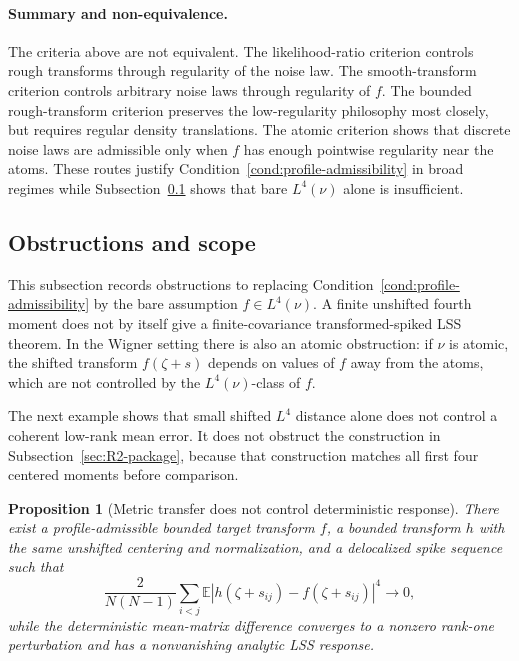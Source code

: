 \documentclass[11pt]{article}
\newtheorem{proposition}[theorem]{Proposition}
\theoremstyle{definition}
\theoremstyle{remark}
\newcommand{\E}{\mathbb E}
\begin{document}
\paragraph{Summary and non-equivalence.}

The criteria above are not equivalent.  The likelihood-ratio criterion controls rough transforms through regularity of the noise law.  The smooth-transform criterion controls arbitrary noise laws through regularity of \(f\).  The bounded rough-transform criterion preserves the low-regularity philosophy most closely, but requires regular density translations.  The atomic criterion shows that discrete noise laws are admissible only when \(f\) has enough pointwise regularity near the atoms.  These routes justify Condition~\ref{cond:profile-admissibility} in broad regimes while Subsection~\ref{app:bare-L4-obstructions} shows that bare \(L^4(\nu)\) alone is insufficient.
\subsection{Obstructions and scope}
\label{app:bare-L4-obstructions}
\label{app:counterexample-W}

This subsection records obstructions to replacing Condition~\ref{cond:profile-admissibility} by the bare assumption \(f\in L^4(\nu)\).  A finite unshifted fourth moment does not by itself give a finite-covariance transformed-spiked LSS theorem.  In the Wigner setting there is also an atomic obstruction: if \(\nu\) is atomic, the shifted transform \(f(\zeta+s)\) depends on values of \(f\) away from the atoms, which are not controlled by the \(L^4(\nu)\)-class of \(f\).

The next example shows that small shifted \(L^4\) distance alone does not control a coherent low-rank mean error.  It does not obstruct the construction in Subsection~\ref{sec:R2-package}, because that construction matches all first four centered moments before comparison.

\begin{proposition}[Metric transfer does not control deterministic response]
\label{prop:E-metric-not-response}
There exist a profile-admissible bounded target transform \(f\), a bounded transform \(h\) with the same unshifted centering and normalization, and a delocalized spike sequence such that
\begin{equation}\label{eq:E-metric-zero}
        \frac{2}{N(N-1)}\sum_{i<j}
        \E|h(\zeta+s_{ij})-f(\zeta+s_{ij})|^4\longrightarrow0,
\end{equation}
while the deterministic mean-matrix difference converges to a nonzero rank-one perturbation and has a nonvanishing analytic LSS response.
\end{proposition}
\end{document}
